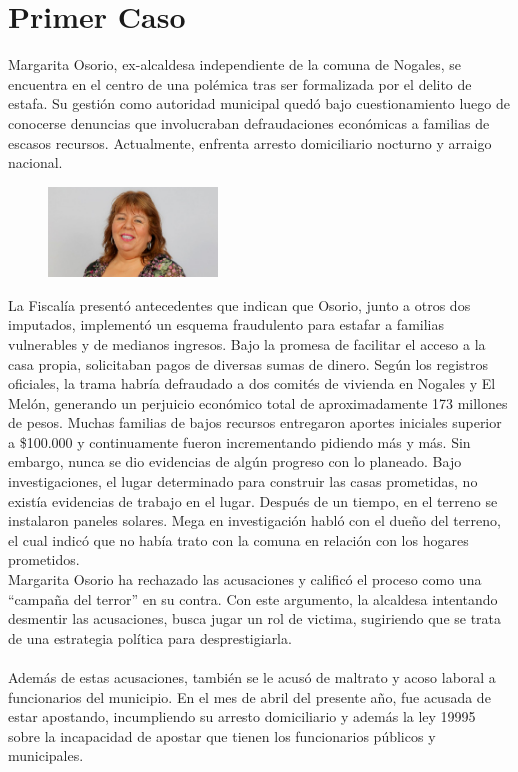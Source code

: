 \documentclass[letter,12pt]{article}
\begin{document}
	\section{Primer Caso\\}
		Margarita Osorio, ex-alcaldesa independiente de la comuna de Nogales, se encuentra en el centro de una polémica tras ser formalizada por el delito de estafa. Su gestión como autoridad municipal quedó bajo cuestionamiento luego de conocerse denuncias que involucraban defraudaciones económicas a familias de escasos recursos. Actualmente, enfrenta arresto domiciliario nocturno y arraigo nacional.\cite{margarita1}\\
	\begin{figure}
		\centering
		\includegraphics[width=0.4\textwidth]{figures/margarita-osorio}
	\end{figure}
	La Fiscalía presentó antecedentes que indican que Osorio, junto a otros dos imputados, implementó un esquema fraudulento para estafar a familias vulnerables y de medianos ingresos. Bajo la promesa de facilitar el acceso a la casa propia, solicitaban pagos de diversas sumas de dinero. Según los registros oficiales, la trama habría defraudado a dos comités de vivienda en Nogales y El Melón, generando un perjuicio económico total de aproximadamente 173 millones de pesos. Muchas familias de bajos recursos entregaron aportes iniciales superior a \$100.000 y continuamente fueron incrementando pidiendo más y más. Sin embargo, nunca se dio evidencias de algún progreso con lo planeado. Bajo investigaciones, el lugar determinado para construir las casas prometidas, no existía evidencias de trabajo en el lugar. Después de un tiempo, en el terreno se instalaron paneles solares. Mega en investigación habló con el dueño del terreno, el cual indicó que no había trato con la comuna en relación con los hogares prometidos. \cite{margarita2}\\
	Margarita Osorio ha rechazado las acusaciones y calificó el proceso como una “campaña del terror” en su contra. Con este argumento, la alcaldesa intentando desmentir las acusaciones, busca jugar un rol de victima, sugiriendo que se trata de una estrategia política para desprestigiarla.\cite{margarita3}\\\\
	Además de estas acusaciones,  también se le acusó de maltrato y acoso laboral a funcionarios del municipio. En el mes de abril del presente año, fue acusada de estar apostando, incumpliendo su arresto domiciliario y además la ley 19995 sobre la incapacidad de apostar que tienen los funcionarios públicos y municipales.
	
\end{document}
